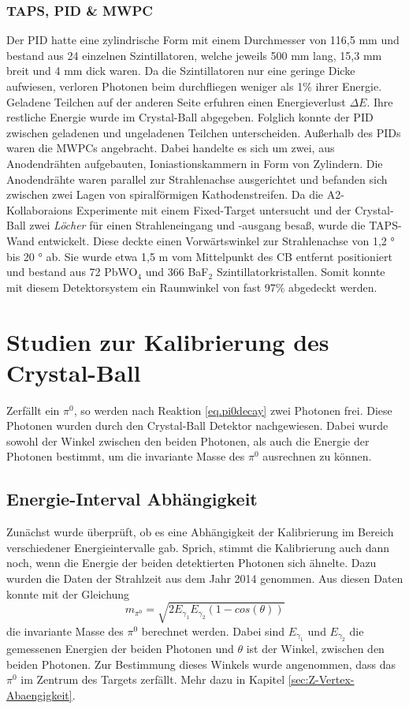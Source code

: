 \documentclass[a4paper,11pt,oneside,final,german,openbib,pdftex]{scrbook}
\begin{document}
{\subsection{TAPS, PID \& MWPC}
Der PID hatte eine zylindrische Form mit einem Durchmesser von 116,5 mm und bestand aus 24 einzelnen Szintillatoren, welche jeweils 500 mm lang, 15,3 mm breit und 4 mm dick waren. Da die Szintillatoren nur eine geringe Dicke aufwiesen, verloren Photonen beim durchfliegen weniger als 1\% ihrer Energie. Geladene Teilchen auf der anderen Seite erfuhren einen Energieverlust $\Delta E$. Ihre restliche Energie wurde im Crystal-Ball abgegeben. Folglich konnte der PID zwischen geladenen und ungeladenen Teilchen unterscheiden. 
Au{\ss}erhalb des PIDs waren die MWPCs angebracht. Dabei handelte es sich um zwei, aus Anodendr\"ahten aufgebauten, Ioniastionskammern in Form von Zylindern. Die Anodendr\"ahte waren parallel zur Strahlenachse ausgerichtet und befanden sich zwischen zwei Lagen von spiralf\"ormigen Kathodenstreifen. 
Da die A2-Kollaboraions Experimente mit einem Fixed-Target untersucht und der Crystal-Ball zwei \textit{L\"ocher} f\"ur einen Strahleneingang und -ausgang besa{\ss}, wurde die TAPS-Wand entwickelt. Diese deckte einen Vorw\"artswinkel zur Strahlenachse von 1,2 ° bis 20 ° ab. Sie wurde etwa 1,5 m vom Mittelpunkt des CB entfernt positioniert und bestand aus 72 PbWO$_4$ und 366 BaF$_2$ Szintillatorkristallen. Somit konnte mit diesem Detektorsystem ein Raumwinkel von fast 97\% abgedeckt werden.


\chapter{Studien zur Kalibrierung des Crystal-Ball}

Zerf\"allt ein $\pi^0$, so werden nach Reaktion \ref{eq.pi0decay} zwei Photonen frei. Diese Photonen wurden durch den Crystal-Ball Detektor nachgewiesen. Dabei wurde sowohl der Winkel zwischen den beiden Photonen, als auch die Energie der Photonen bestimmt, um die invariante Masse des $\pi^0$ ausrechnen zu k\"onnen.


\section{Energie-Interval Abhängigkeit}
\label{sec:Energie-Interval-Abhaengigkeit}

Zunächst wurde überprüft, ob es eine Abhängigkeit der Kalibrierung im Bereich verschiedener Energieintervalle gab. Sprich, stimmt die Kalibrierung auch dann noch, wenn die Energie der beiden detektierten Photonen sich ähnelte. Dazu wurden die Daten der Strahlzeit aus dem Jahr 2014 genommen. Aus diesen Daten konnte mit der Gleichung
\begin{equation}
m_{\pi^0}=\sqrt{2E_{\gamma_1}E_{\gamma_2}(1-cos(\theta))}
\label{eq:invariantmass}
\end{equation}
die invariante Masse des $\pi^0$ berechnet werden. Dabei sind $E_{\gamma_1}$ und $E_{\gamma_2}$ die gemessenen Energien der beiden Photonen und $\theta$ ist der Winkel, zwischen den beiden Photonen. Zur Bestimmung dieses Winkels wurde angenommen, dass das $\pi^0$ im Zentrum des Targets zerfällt. Mehr dazu in Kapitel \ref{sec:Z-Vertex-Abaengigkeit}.

}
\end{document}
